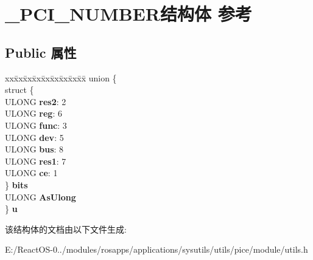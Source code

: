 \hypertarget{struct___p_c_i___n_u_m_b_e_r}{}\section{\+\_\+\+P\+C\+I\+\_\+\+N\+U\+M\+B\+E\+R结构体 参考}
\label{struct___p_c_i___n_u_m_b_e_r}
\subsection*{Public 属性}
\begin{DoxyCompactItemize}
\item 
\mbox{\label{struct___p_c_i___n_u_m_b_e_r_af2084a82b325dd3707ec40ccc1a71781}} 
\begin{tabbing}
xx\=xx\=xx\=xx\=xx\=xx\=xx\=xx\=xx\=\kill
union \{\\
\>struct \{\\
\>\>ULONG {\bfseries res2}: 2\\
\>\>ULONG {\bfseries reg}: 6\\
\>\>ULONG {\bfseries func}: 3\\
\>\>ULONG {\bfseries dev}: 5\\
\>\>ULONG {\bfseries bus}: 8\\
\>\>ULONG {\bfseries res1}: 7\\
\>\>ULONG {\bfseries ce}: 1\\
\>\} {\bfseries bits}\\
\>ULONG {\bfseries AsUlong}\\
\} {\bfseries u}\\

\end{tabbing}\end{DoxyCompactItemize}


该结构体的文档由以下文件生成\+:\begin{DoxyCompactItemize}
\item 
E\+:/\+React\+O\+S-\/0../modules/rosapps/applications/sysutils/utils/pice/module/utils.\+h\end{DoxyCompactItemize}
